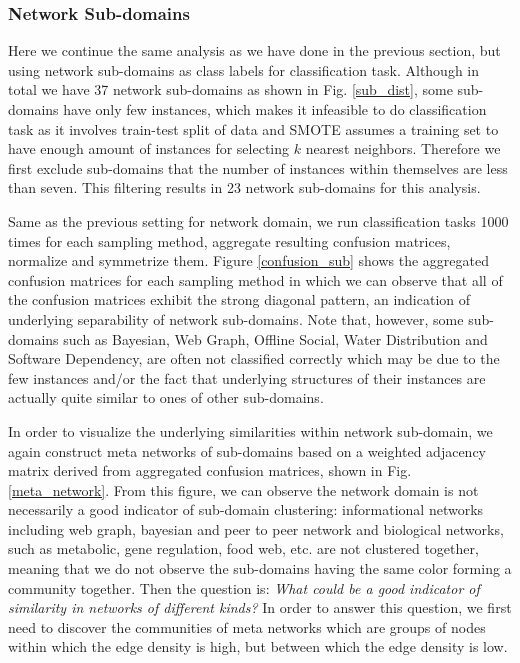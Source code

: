 \documentclass{article}
\begin{document}
\subsubsection{Network Sub-domains}
Here we continue the same analysis as we have done in the previous section, but using network sub-domains as class labels for classification task.
Although in total we have 37 network sub-domains as shown in Fig. \ref{sub_dist}, some sub-domains have only few instances, which makes it infeasible to do classification task as it involves train-test split of data and SMOTE assumes a training set to have enough amount of instances for selecting $k$ nearest neighbors. Therefore we first exclude sub-domains that the number of instances within themselves are less than seven. This filtering results in 23 network sub-domains for this analysis. 

Same as the previous setting for network domain, we run classification tasks 1000 times for each sampling method, aggregate resulting confusion matrices, normalize and symmetrize them. Figure \ref{confusion_sub} shows the aggregated confusion matrices for each sampling method in which we can observe that all of the confusion matrices exhibit the strong diagonal pattern, an indication of underlying separability of network sub-domains. Note that, however, some sub-domains such as Bayesian, Web Graph, Offline Social, Water Distribution and Software Dependency, are often not classified correctly which may be due to the few instances and/or the fact that underlying structures of their instances are actually quite similar to ones of other sub-domains.

In order to visualize the underlying similarities within network sub-domain, we again construct meta networks of sub-domains based on a weighted adjacency matrix derived from aggregated confusion matrices, shown in Fig.\ref{meta_network}. From this figure, we can observe the network domain is not necessarily a good indicator of sub-domain clustering: informational networks including web graph, bayesian and peer to peer network and biological networks, such as metabolic, gene regulation, food web, etc. are not clustered together, meaning that we do not observe the sub-domains having the same color forming a community together. Then the question is: \textit{What could be a good indicator of similarity in networks of different kinds?} In order to answer this question, we first need to discover the communities of meta networks which are groups of nodes within which the edge density is high, but between which the edge density is low.
\end{document}
